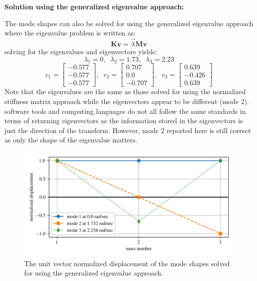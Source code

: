 \documentclass[12pt,letter]{article}
\begin{document}
\begin{example}
	\noindent \textbf{Solution using the generalized eigenvalue approach:}

	\noindent The mode shapes can also be solved for using the generalized eigenvalue approach where the eigenvalue problem is written as:
	\begin{equation}
	\textbf{K}\textbf{v} = \vec{\lambda}\textbf{M}\textbf{v}
	\end{equation}
	solving for the eigenvalues and eigenvectors yields:
	\begin{equation}
	\lambda_1 = 0, \; \; \lambda_2 = 1.73, \; \; \lambda_3 = 2.23
	\end{equation}
	\begin{equation}
	v_1 = \begin{bmatrix} -0.577 \\    -0.577 \\   -0.577  \end{bmatrix}, \; \; v_2 = \begin{bmatrix} 0.707 \\    0.0 \\    -0.707 \end{bmatrix}, \; \; v_3 = \begin{bmatrix} 0.639 \\    -0.426 \\    0.639 \end{bmatrix}
	\end{equation}
	Note that the eigenvalues are the same as those solved for using the normalized stiffness matrix approach while the eigenvectors appear to be different (mode 2). software tools and computing languages do not all follow the same standards in terms of returning eigenvectors as the information stored in the eigenvectors is just the direction of the transform. However, mode 2 reported here is still correct as only the shape of the eigenvalue matters.
	
	\begin{figure}[H]
		\centering
		\includegraphics[width=\linewidth]{../figures/mode_shape_aiplane_example_generalized_eigenvalue.png}
		\caption{The unit vector normalized displacement of the mode shapes solved for using the generalized eigenvalue approach.}
		\label{fig:mode_shape_aiplane_example_generalized_eigenvalue}
	\end{figure}

	\end{example}
	
\end{document}
